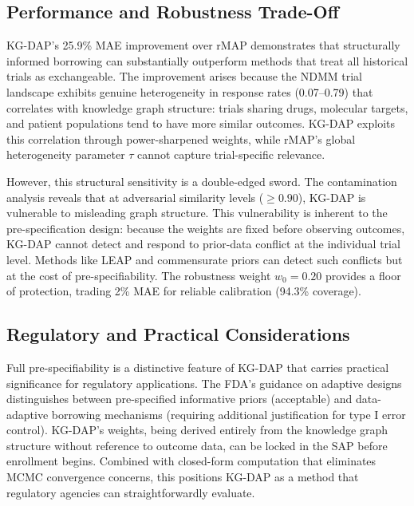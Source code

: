 \documentclass[12pt]{article}
\begin{document}
\subsection{Performance and Robustness Trade-Off}

KG-DAP's 25.9\% MAE improvement over rMAP demonstrates that structurally informed borrowing can substantially outperform methods that treat all historical trials as exchangeable. The improvement arises because the NDMM trial landscape exhibits genuine heterogeneity in response rates (0.07--0.79) that correlates with knowledge graph structure: trials sharing drugs, molecular targets, and patient populations tend to have more similar outcomes. KG-DAP exploits this correlation through power-sharpened weights, while rMAP's global heterogeneity parameter $\tau$ cannot capture trial-specific relevance.

However, this structural sensitivity is a double-edged sword. The contamination analysis reveals that at adversarial similarity levels ($\geq 0.90$), KG-DAP is vulnerable to misleading graph structure. This vulnerability is inherent to the pre-specification design: because the weights are fixed before observing outcomes, KG-DAP cannot detect and respond to prior-data conflict at the individual trial level. Methods like LEAP \citep{alt2024leap} and commensurate priors \citep{hobbs2011hierarchical} can detect such conflicts but at the cost of pre-specifiability. The robustness weight $w_0 = 0.20$ provides a floor of protection, trading 2\% MAE for reliable calibration (94.3\% coverage).

\subsection{Regulatory and Practical Considerations}

Full pre-specifiability is a distinctive feature of KG-DAP that carries practical significance for regulatory applications. The FDA's guidance on adaptive designs \citep{fda2019adaptive} distinguishes between pre-specified informative priors (acceptable) and data-adaptive borrowing mechanisms (requiring additional justification for type I error control). KG-DAP's weights, being derived entirely from the knowledge graph structure without reference to outcome data, can be locked in the SAP before enrollment begins. Combined with closed-form computation that eliminates MCMC convergence concerns, this positions KG-DAP as a method that regulatory agencies can straightforwardly evaluate.
\end{document}
